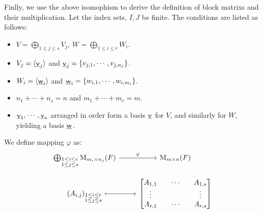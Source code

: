 Finlly, we use the above isomophism to derive the definition of block matrixs and their multiplication. Let the index sets, $I, J$ be finite. The conditions are listed as follows:
\begin{itemize}
    \item $V = \bigoplus_{1 \leq j \leq s} V_j,\ W = \bigoplus_{1 \leq i \leq r} W_i$.
    \item $V_j = \lag \bs{V}{j} \rag$ and $\bs{V}{j} = \{ v_{j,1}, \cdots, v_{j, n_j} \}$.
    \item $W_i = \lag \bs{W}{i} \rag$ and $\bs{W}{i} = \{ w_{i,1}, \cdots, w_{i, m_i} \}$.
    \item $n_1 + \cdots + n_s = n$ and $m_1 + \cdots + m_r = m$.
    \item $\bs{V}{1}, \cdots, \bs{V}{s}$ arranged in order form a basis $\bs{V}{}$ for $V$, and similarly for $W$, yielding a basis $\bs{W}{}$. 
\end{itemize}
We define mapping $\varphi$ as:
\[
    \begin{tikzcd}[row sep=small]
        \bigoplus_{\substack{1 \leq i \leq r \\ 1 \leq j \leq s}}\Mat_{m_i \times n_j}(F) \arrow[r, "\varphi"]
        & \Mat_{m \times n}(F) \\
        (A_{i, j})_{\substack{1 \leq i \leq r \\ 1 \leq j \leq s}} \arrow[mapsto, r]
        & \begin{bmatrix}
            A_{1, 1} & \cdots & A_{1, s} \\
            \vdots & & \vdots \\
            A_{r, 1} & \cdots & A_{r, s}
        \end{bmatrix}
    \end{tikzcd}
\]



